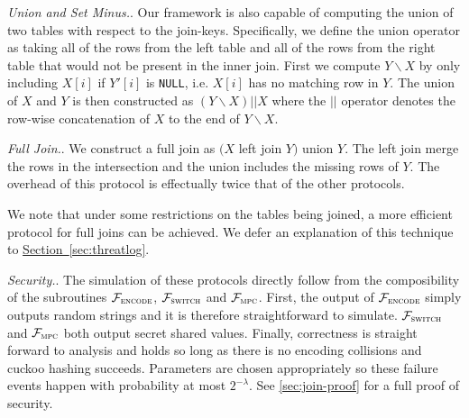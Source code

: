 \documentclass[11pt,letterpaper]{article}
\newcommand{\Null}{\texttt{NULL}\xspace}
\newcommand{\namedref}[2]{\hyperref[#2]{#1~\ref*{#2}}}
\newcommand{\sectionref}[1]{\namedref{Section}{#1}}
\renewcommand{\paragraph}[1]{\vspace{0.1cm}\noindent\emph{#1}.}
\newcommand{\f}[1]{\ensuremath{\mathcal{F}_{\textsc{#1}}}}
\begin{document}
\paragraph{Union and Set Minus.}
Our framework is also capable of computing the union of two tables with respect to the join-keys. Specifically, we define the union operator as taking all of the rows from the left table and all of the rows from the right table that would not be present in the inner join. First we compute $Y\backslash X$ by only including $X[i]$ if $Y'[i]$ is \Null, i.e. $X[i]$ has no matching row in $Y$. The union of $X$ and $Y$ is then constructed as $(Y\backslash X) || X$ where the $||$ operator denotes the row-wise concatenation of $X$ to the end of $Y\backslash X$.


\paragraph{Full Join.}
We construct a full join as $(X$ left join $Y)$ union $Y$. The left join merge the rows in the intersection and the union includes the missing rows of $Y$. The overhead of this protocol is effectually twice that of the other protocols. 

We note that under some restrictions on the tables being joined, a more efficient protocol for full joins can be achieved. We defer an explanation of this technique to \sectionref{sec:threatlog}.

\paragraph{Security.} The simulation of these protocols directly follow from the composibility of the subroutines \f{encode}, \f{switch} and \f{mpc}. First, the output of \f{encode} simply outputs random strings and it is therefore straightforward to simulate.  \f{switch} and \f{mpc} both output secret shared values. Finally, correctness is straight forward to analysis and holds so long as there is no encoding collisions and cuckoo hashing succeeds. Parameters are chosen appropriately so these failure events happen with probability at most $2^{-\lambda}$. See \ref{sec:join-proof} for a full proof of security.
\end{document}
